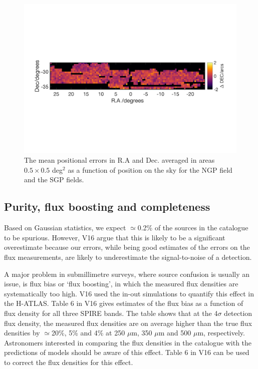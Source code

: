 \documentclass[useAMS,usenatbib]{mnras}
\begin{document}
\begin{figure}
\includegraphics[scale=0.6,trim={0 60mm 0mm 80mm}, clip]{sgp_ddec.png}
\caption{\protect\label{fig_pos_errs} The mean positional errors in
  R.A and Dec. averaged in areas $0.5\times0.5$ deg$^2$ as a
  function of position on the sky for the NGP field and the SGP
  fields. 
}
\end{figure} 

\subsection{Purity, flux boosting and completeness}

Based on Gaussian statistics, we expect $\simeq$0.2\% of the sources
in the catalogue to be spurious. However, V16 argue that this is
likely to be a significant overestimate because our errors, while
being good estimates of the errors on the flux measurements, are
likely to underestimate the signal-to-noise of a detection.

A major problem in submillimetre surveys, where source confusion is
usually an issue, is flux bias or `flux boosting', in which the
measured flux densities are systematically too high. V16 used the
in-out simulations to quantify this effect in the H-ATLAS. Table 6 in
V16 gives estimates of the flux bias as a function of flux density for
all three SPIRE bands. The table shows that at the 4$\sigma$ detection
flux density, the measured flux densities are on average higher than
the true flux densities by $\simeq$20\%, 5\% and 4\% at 250 $\mu$m,
350 $\mu$m and 500 $\mu$m, respectively. Astronomers interested in
comparing the flux densities in the catalogue with the predictions of
models should be aware of this effect. Table 6 in V16 can be used to
correct the flux densities for this effect.
\end{document}
